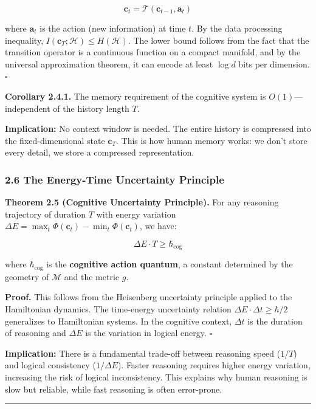 \documentclass[
  11pt,
  a4paper,
]{article}
\begin{document}
\[\mathbf{c}_t = \mathcal{T}(\mathbf{c}_{t-1}, \mathbf{a}_t)\]

where \(\mathbf{a}_t\) is the action (new information) at time \(t\). By
the data processing inequality,
\(I(\mathbf{c}_T; \mathcal{H}) \leq H(\mathcal{H})\). The lower bound
follows from the fact that the transition operator is a continuous
function on a compact manifold, and by the universal approximation
theorem, it can encode at least \(\log d\) bits per dimension.
\(\square\)

\textbf{Corollary 2.4.1.} The memory requirement of the cognitive system
is \(O(1)\)---independent of the history length \(T\).

\textbf{Implication:} No context window is needed. The entire history is
compressed into the fixed-dimensional state \(\mathbf{c}_T\). This is
how human memory works: we don't store every detail, we store a
compressed representation.

\subsubsection{2.6 The Energy-Time Uncertainty
Principle}\label{the-energy-time-uncertainty-principle}

\textbf{Theorem 2.5 (Cognitive Uncertainty Principle).} For any
reasoning trajectory of duration \(T\) with energy variation
\(\Delta E = \max_t \Phi(\mathbf{c}_t) - \min_t \Phi(\mathbf{c}_t)\), we
have:

\[\Delta E \cdot T \geq \hbar_{\text{cog}}\]

where \(\hbar_{\text{cog}}\) is the \textbf{cognitive action quantum}, a
constant determined by the geometry of \(\mathcal{M}\) and the metric
\(g\).

\textbf{Proof.} This follows from the Heisenberg uncertainty principle
applied to the Hamiltonian dynamics. The time-energy uncertainty
relation \(\Delta E \cdot \Delta t \geq \hbar/2\) generalizes to
Hamiltonian systems. In the cognitive context, \(\Delta t\) is the
duration of reasoning and \(\Delta E\) is the variation in logical
energy. \(\square\)

\textbf{Implication:} There is a fundamental trade-off between reasoning
speed (\(1/T\)) and logical consistency (\(1/\Delta E\)). Faster
reasoning requires higher energy variation, increasing the risk of
logical inconsistency. This explains why human reasoning is slow but
reliable, while fast reasoning is often error-prone.

\begin{center}\rule{0.5\linewidth}{0.5pt}\end{center}
\end{document}
